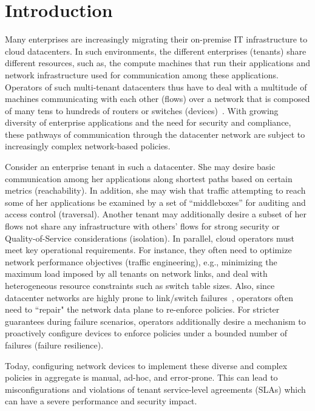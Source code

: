 \section{Introduction}

Many enterprises are increasingly migrating their on-premise IT
infrastructure to cloud datacenters. In such environments, the
different enterprises (tenants) share different resources, such as,
the compute machines that run their applications and network
infrastructure used for communication among these applications.
Operators of such multi-tenant datacenters thus have to deal with a
multitude of machines communicating with each other (flows) over a
network that is composed of many tens to hundreds of routers or
switches (devices)~\cite{mpa-imc15}. With growing diversity of
enterprise applications and the need for security and compliance,
these pathways of communication through the datacenter network are
subject to increasingly complex network-based policies.

Consider an enterprise tenant in such a datacenter. She may desire
basic communication among her applications along shortest paths based
on certain metrics (reachability). In addition, she may wish that
traffic attempting to reach some of her applications be examined by a
set of ``middleboxes'' for auditing and access control
(traversal). Another tenant may additionally desire a subset of her
flows not share any infrastructure with others' flows for strong
security or Quality-of-Service considerations (isolation).  In
parallel, cloud operators must meet key operational requirements. For
instance, they often need to optimize network performance objectives
(traffic engineering), e.g., minimizing the maximum load imposed by
all tenants on network links, and deal with heterogeneous resource
constraints such as switch table sizes. Also, since datacenter
networks are highly prone to link/switch
failures~\cite{gill-sigcomm11}, operators often need to ``repair" the
network data plane to re-enforce policies. For stricter guarantees
during failure scenarios, operators additionally desire a mechanism to
proactively configure devices to enforce policies under a bounded
number of failures (failure resilience).

Today, configuring network devices to implement these diverse and
complex policies in aggregate is manual, ad-hoc, and error-prone.
This can lead to misconfigurations and violations of tenant
service-level agreements (SLAs) which can have a severe performance
and security impact.

